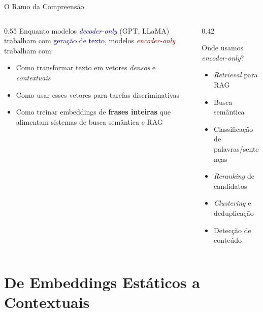 \documentclass[aspectratio=169, xcolor=dvipsnames]{beamer}
\begin{document}
  \begin{frame}{O Ramo da Compreensão}
    \begin{columns}
      \begin{column}{0.55\textwidth}
        Enquanto modelos \textcolor{DarkBlue}{\textit{decoder-only}} (GPT, LLaMA) trabalham com \textcolor{DarkBlue}{geração de texto}, modelos \textcolor{DarkRed}{\textit{encoder-only}} trabalham com:
        \begin{itemize}
          \item Como transformar texto em vetores \textit{densos} e \textit{contextuais}
          \item Como usar esses vetores para tarefas discriminativas
          \item Como treinar embeddings de \textbf{frases inteiras} que alimentam sistemas de busca semântica e RAG
        \end{itemize}
      \end{column}
      \begin{column}{0.42\textwidth}
        \begin{exampleblock}{Onde usamos \textit{encoder-only}?}
          \begin{itemize}
            \item \textit{Retrieval} para RAG
            \item Busca semântica
            \item Classificação de palavras/sentenças
            \item \textit{Reranking} de candidatos
            \item \textit{Clustering} e deduplicação
            \item Detecção de conteúdo
          \end{itemize}
        \end{exampleblock}
      \end{column}
    \end{columns}
  \end{frame}

  \section{De Embeddings Estáticos a Contextuais}
\end{document}
